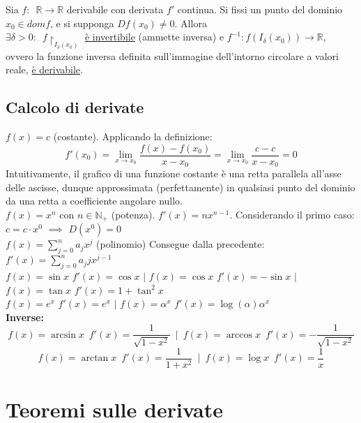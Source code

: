 \documentclass[10pt]{article}
\theoremstyle{plain}
\begin{document}
\begin{ther}
Sia $f : \enspace \mathbb{R} \rightarrow \mathbb{R}$ derivabile con derivata $f'$ continua. Si fissi un punto del dominio $x_0 \in dom f$, e si supponga $D f (x_0) \neq 0$. Allora\\
$\exists \delta > 0 : \enspace f\restriction_{I_\delta(x_0)}$ \underline{è invertibile} (ammette inversa) e $f^{-1} : f( I_\delta(x_0)) \rightarrow \mathbb{R}$, ovvero la funzione inversa definita sull'immagine dell'intorno circolare a valori reale, \underline{è derivabile}.
\end{ther}

\subsection{Calcolo di derivate}
$f(x) = c$ (costante). Applicando la definizione:
    \[f'(x_0) = \lim \limits_{x \rightarrow x_0} \frac{f(x) - f(x_0)}{x - x_0} = \lim \limits_{x \rightarrow x_0} \frac{c - c}{x - x_0} = 0\]
    Intuitivamente, il grafico di una funzione costante è una retta parallela all'asse delle ascisse, dunque approssimata (perfettamente) in qualsiasi punto del dominio da una retta a coefficiente angolare nullo.
    \\$f(x) = x^n$ con $n \in \mathbb{N}_+$ (potenza). $f'(x) = n x^{n-1}$. Considerando il primo caso: $c = c \cdot x^0$ $\implies$ $D(x^0) = 0$
    \\$f(x) = \sum \limits_{j = 0}^{n} a_j x^j$ (polinomio) Consegue dalla precedente: $f'(x) = \sum \limits_{j = 0}^{n} a_j j x^{j-1}$
    \\$f(x) = \sin x$ $f'(x) = \cos x$ $\bigg|$ $f(x) = \cos x$ $f'(x) = -\sin x$ $\bigg|$ $f(x) = \tan x$ $f'(x) = 1 + \tan^2 x$
    \\$f(x) = e^x$ $f'(x) = e^x$ $\bigg|$ $f(x) = \alpha^x$ $f'(x) = \log(\alpha) \alpha^x$
    \\\textbf{Inverse:}
    \[f(x) = \arcsin x \enspace f'(x) = \frac{1}{\sqrt{1 - x^2}} \enspace \bigg| \enspace f(x) = \arccos x \enspace f'(x) = - \frac{1}{\sqrt{1 - x^2}}\]
    \[f(x) = \arctan x \enspace f'(x) = \frac{1}{1 + x^2} \enspace \bigg| \enspace f(x) = \log x \enspace f'(x) = \frac{1}{x}\]


\section{Teoremi sulle derivate}
\end{document}
